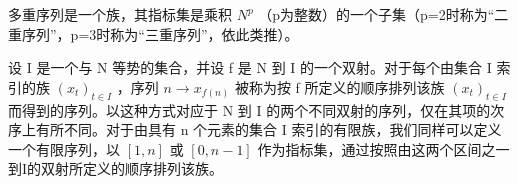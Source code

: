 多重序列是一个族，其指标集是乘积 \(N^{p}\) （p为整数）的一个子集（p=2时称为“二重序列”，p=3时称为“三重序列”，依此类推）。

设 I 是一个与 N 等势的集合，并设 f 是 N 到 I 的一个双射。对于每个由集合 I 索引的族 \((x_{t})_{t\in I}\) ，序列 \(n\to x_{f(n)}\) 被称为按 f 所定义的顺序排列该族 \((x_{t})_{t\in I}\) 而得到的序列。以这种方式对应于 N 到 I 的两个不同双射的序列，仅在其项的次序上有所不同。对于由具有 n 个元素的集合 I 索引的有限族，我们同样可以定义一个有限序列，以 \([1,n]\) 或 \([0,n-1]\) 作为指标集，通过按照由这两个区间之一到I的双射所定义的顺序排列该族。

